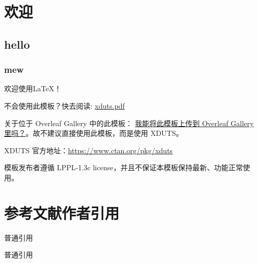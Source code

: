 \documentclass{xduugthesis}
\begin{document}
\chapter{欢迎}

\section{hello}

\subsection{mew}

欢迎使用\LaTeX{}！

不会使用此模板？快去阅读: \href{https://download.nus.edu.sg/mirror/ctan/macros/xetex/latex/xduts/xduts.pdf}{xduts.pdf}

关于位于 Overleaf Gallery 中的此模板： \href{https://github.com/note286/xduts/discussions/114}{我能将此模板上传到 Overleaf Gallery 里吗？}。故不建议直接使用此模板，而是使用 XDUTS。

XDUTS 官方地址：\href{https://www.ctan.org/pkg/xduts}{https://www.ctan.org/pkg/xduts}

模板发布者遵循 LPPL-1.3c license，并且不保证本模板保持最新、功能正常使用。

\chapter{参考文献作者引用}

普通引用\cite{xxx}

普通引用\cite{yyy}
\end{document}
